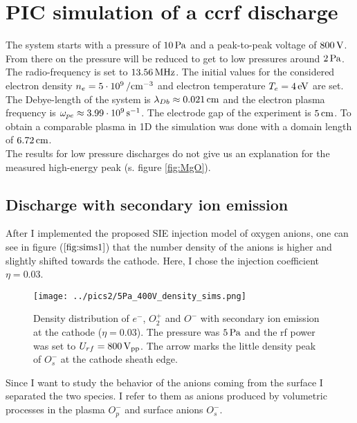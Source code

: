 \chapter{PIC simulation of a ccrf discharge}
\label{PIC_discharge}

The system starts with a pressure of $10\,\mathrm{Pa}$ and a peak-to-peak voltage of $800\,\mathrm{V}$. 
From there on the pressure will be reduced to get to low pressures around $2\,\mathrm{Pa}$.
The radio-frequency is set to $13.56\,\mathrm{MHz}$.
The initial values for the considered electron density $n_e=5\cdot 10^{9}\,\mathrm{/cm^{-3}}$ and electron temperature $T_e = 4 \,\mathrm{eV}$ are set.\\
The Debye-length of the system is $\lambda_{Db} \approx 0.021 \,\mathrm{cm}$ and the electron plasma frequency is $\omega_{pe}\approx 3.99 \cdot 10^9 \,\mathrm{s^{-1}}$.
The electrode gap of the experiment is $5\,\mathrm{cm}$. 
To obtain a comparable plasma in 1D the simulation was done with a domain length of $6.72\,\mathrm{cm}$.\\
The results for low pressure discharges do not give us an explanation for the measured high-energy peak (s. figure \ref{fig:MgO}).

\newpage
\section{Discharge with secondary ion emission}

After I implemented the proposed SIE injection model of oxygen anions, one can see in figure ($\ref{fig:sims1}$) that the number density of the anions is higher and slightly shifted towards the cathode.
Here, I chose the injection coefficient $\eta=0.03$.

\begin{figure}[htbp]
    \centering
    \texttt{[image: ../pics2/5Pa\_400V\_density\_sims.png]}
    \caption{Density distribution of $e^-$, $O_2^+$ and $O^-$ with secondary ion emission at the cathode ($\eta=0.03$). The pressure was $5\,\mathrm{Pa}$ and the rf power was set to $U_{rf}=800\,\mathrm{V_{pp}}$. The arrow marks the little density peak of $O^-_s$ at the cathode sheath edge.}
    \label{fig:sims1}
\end{figure}

Since I want to study the behavior of the anions coming from the surface I separated the two species.
I refer to them as anions produced by volumetric processes in the plasma $O^-_p$ and surface anions $O^-_s$. 

